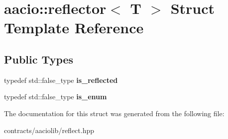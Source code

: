 \hypertarget{structaacio_1_1reflector}{}\section{aacio\+:\+:reflector$<$ T $>$ Struct Template Reference}
\label{structaacio_1_1reflector}
\subsection*{Public Types}
\begin{DoxyCompactItemize}
\item 
\mbox{\label{structaacio_1_1reflector_a35505f262eeacc06bbfbabf0f76963a2}} 
typedef std\+::false\+\_\+type {\bfseries is\+\_\+reflected}
\item 
\mbox{\label{structaacio_1_1reflector_a572bc2fb27f8ee89554d8d17a00d5127}} 
typedef std\+::false\+\_\+type {\bfseries is\+\_\+enum}
\end{DoxyCompactItemize}


The documentation for this struct was generated from the following file\+:\begin{DoxyCompactItemize}
\item 
contracts/aaciolib/reflect.\+hpp\end{DoxyCompactItemize}
